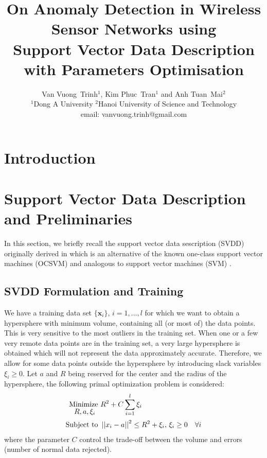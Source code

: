 \documentclass[journal,transmag,times]{IEEEtran}
\begin{document}
\title{On Anomaly Detection in Wireless Sensor Networks using\\Support Vector Data Description with Parameters Optimisation}

\author{
Van Vuong~Trinh$^1$,
Kim Phuc~Tran$^1$ and 
Anh Tuan~Mai$^2$\\
$^1$Dong A University
$^2$Hanoi University of Science and Technology\\
email: vanvuong.trinh@gmail.com
}


\maketitle

\section{Introduction}

\section{Support Vector Data Description and Preliminaries}

In this section, we briefly recall the support vector data sescription (SVDD) originally derived in \cite{Tax2004} which is an alternative of the known one-class support vector machines (OCSVM) \cite{Scholkopf2000} and analogous to support vector machines (SVM) \cite{Vapnik1998}.

\subsection{SVDD Formulation and Training}

We have a training data set $\{ \mathbf{x}_i \}$, $i=1,\dots,l$ for which we want to obtain a hypersphere with minimum volume, containing all (or most of) the data points. This is very sensitive to the most outliers in the training set. When one or a few very remote data points are in the training set, a very large hypersphere is obtained which will not represent the data approximately accurate. Therefore, we allow for some data points outside the hypersphere by introducing slack variables $\xi_i \ge 0$. Let $a$ and $R$ being reserved for the center and the radius of the hypersphere, the following primal optimization problem is considered:
\begin{subequations}\label{eq:svdd_primal_sphere}
\begin{align}
\underset{
	\begin{array}{c}
		 R, a, \xi_i
	\end{array}}{\text{Minimize }} & R^2 + C \sum_{i=1}^l \xi_i \\
\text{Subject to } & \left|\left| x_i - a \right|\right|^2 \le R^2 + \xi_i, \thinspace \xi_i \ge 0 \quad \forall i
\end{align}
\end{subequations}
where the parameter $C$ control the trade-off between the volume and errors (number of normal data rejected).
\end{document}
